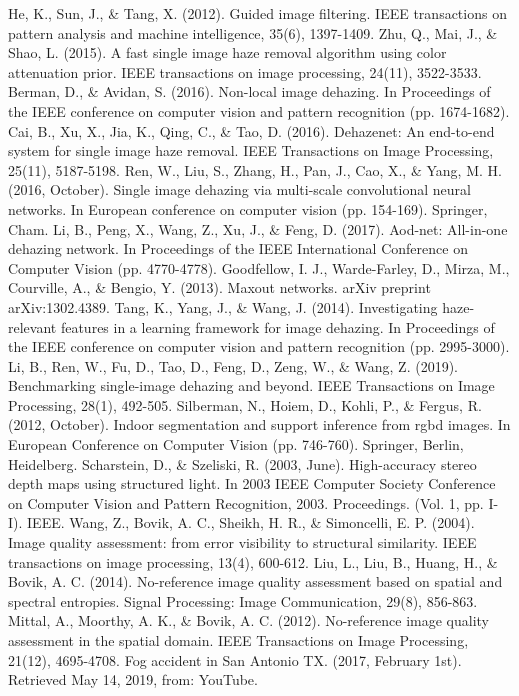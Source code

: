 \documentclass[a4paper, 12pt, oneside]{report}
\begin{document}
\begin{thebibliography}{99}
 He, K., Sun, J., \& Tang, X. (2012). Guided image filtering. IEEE transactions on pattern analysis and machine intelligence, 35(6), 1397-1409.
 Zhu, Q., Mai, J., \& Shao, L. (2015). A fast single image haze removal algorithm using color attenuation prior. IEEE transactions on image processing, 24(11), 3522-3533.
 Berman, D., \& Avidan, S. (2016). Non-local image dehazing. In Proceedings of the IEEE conference on computer vision and pattern recognition (pp. 1674-1682).
 Cai, B., Xu, X., Jia, K., Qing, C., \& Tao, D. (2016). Dehazenet: An end-to-end system for single image haze removal. IEEE Transactions on Image Processing, 25(11), 5187-5198.
 Ren, W., Liu, S., Zhang, H., Pan, J., Cao, X., \& Yang, M. H. (2016, October). Single image dehazing via multi-scale convolutional neural networks. In European conference on computer vision (pp. 154-169). Springer, Cham.
 Li, B., Peng, X., Wang, Z., Xu, J., \& Feng, D. (2017). Aod-net: All-in-one dehazing network. In Proceedings of the IEEE International Conference on Computer Vision (pp. 4770-4778).
 Goodfellow, I. J., Warde-Farley, D., Mirza, M., Courville, A., \& Bengio, Y. (2013). Maxout networks. arXiv preprint arXiv:1302.4389.
 Tang, K., Yang, J., \& Wang, J. (2014). Investigating haze-relevant features in a learning framework for image dehazing. In Proceedings of the IEEE conference on computer vision and pattern recognition (pp. 2995-3000).
 Li, B., Ren, W., Fu, D., Tao, D., Feng, D., Zeng, W., \& Wang, Z. (2019). Benchmarking single-image dehazing and beyond. IEEE Transactions on Image Processing, 28(1), 492-505.
 Silberman, N., Hoiem, D., Kohli, P., \& Fergus, R. (2012, October). Indoor segmentation and support inference from rgbd images. In European Conference on Computer Vision (pp. 746-760). Springer, Berlin, Heidelberg.
 Scharstein, D., \& Szeliski, R. (2003, June). High-accuracy stereo depth maps using structured light. In 2003 IEEE Computer Society Conference on Computer Vision and Pattern Recognition, 2003. Proceedings. (Vol. 1, pp. I-I). IEEE.
 Wang, Z., Bovik, A. C., Sheikh, H. R., \& Simoncelli, E. P. (2004). Image quality assessment: from error visibility to structural similarity. IEEE transactions on image processing, 13(4), 600-612.
 Liu, L., Liu, B., Huang, H., \& Bovik, A. C. (2014). No-reference image quality assessment based on spatial and spectral entropies. Signal Processing: Image Communication, 29(8), 856-863.
 Mittal, A., Moorthy, A. K., \& Bovik, A. C. (2012). No-reference image quality assessment in the spatial domain. IEEE Transactions on Image Processing, 21(12), 4695-4708.
 Fog accident in San Antonio TX. (2017, February 1st). Retrieved May 14, 2019, from: YouTube. 

\end{thebibliography}
\end{document}
